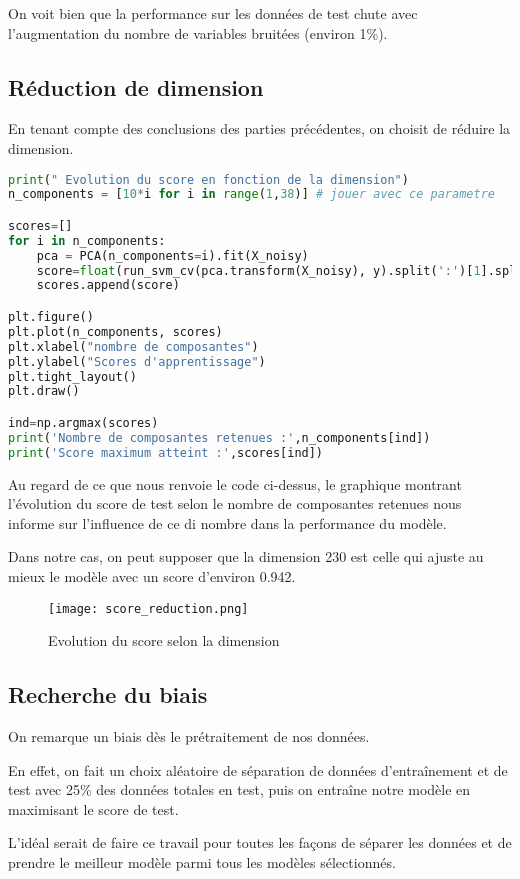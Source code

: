 \documentclass[a4paper, 12pt]{article}
\begin{document}
On voit bien que la performance sur les données de test chute avec l'augmentation du nombre de variables bruitées (environ 1\%).

\subsection{Réduction de dimension}\label{subsec:reduction}

En tenant compte des conclusions des parties précédentes, on choisit de réduire la dimension.

\begin{lstlisting}[language=Python, caption= réduction de dimension]
print(" Evolution du score en fonction de la dimension")
n_components = [10*i for i in range(1,38)] # jouer avec ce parametre

scores=[]
for i in n_components:
    pca = PCA(n_components=i).fit(X_noisy)
    score=float(run_svm_cv(pca.transform(X_noisy), y).split(':')[1].split(' ')[2])
    scores.append(score)

plt.figure()
plt.plot(n_components, scores)
plt.xlabel("nombre de composantes")
plt.ylabel("Scores d'apprentissage")
plt.tight_layout()
plt.draw()

ind=np.argmax(scores)
print('Nombre de composantes retenues :',n_components[ind])
print('Score maximum atteint :',scores[ind])
\end{lstlisting}

Au regard de ce que nous renvoie le code ci-dessus, le graphique montrant l'évolution du score de test selon le nombre de composantes retenues nous informe sur l'influence de ce di nombre dans la performance du modèle. 

Dans notre cas, on peut supposer que la dimension 230 est celle qui ajuste au mieux le modèle avec un score d'environ 0.942.

\begin{figure}[h!]
    \centering
    \texttt{[image: score\_reduction.png]}
    \caption{Evolution du score selon la dimension}
    \label{fig:placeholder}
\end{figure}

\newpage

\subsection{Recherche du biais}

On remarque un biais dès le prétraitement de nos données. 

En effet, on fait un choix aléatoire de séparation de données d’entraînement et de test avec 25\% des données totales en test, puis on entraîne notre modèle en maximisant le score de test. 

L’idéal serait de faire ce travail pour toutes les façons de séparer les données et de prendre le meilleur modèle parmi tous les modèles sélectionnés. 
\end{document}
